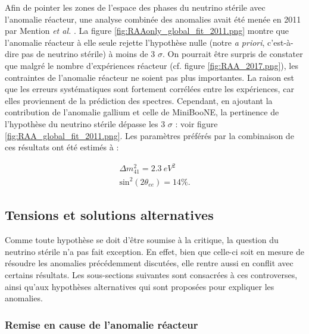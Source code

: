 Afin de pointer les zones de l'espace des phases du neutrino stérile avec l'anomalie réacteur, une analyse combinée des anomalies avait été menée en 2011 par Mention \textit{et al.} \cite{Mention:2011rk}. La figure \ref{fig:RAAonly_global_fit_2011.png} montre que l'anomalie réacteur à elle seule rejette l'hypothèse nulle (notre \textit{a priori}, c'est-à-dire pas de neutrino stérile) à moins de 3 $\sigma$. On pourrait être surpris de constater que malgré le nombre d'expériences réacteur (cf. figure \ref{fig:RAA_2017.png}), les contraintes de l'anomalie réacteur ne soient pas plus importantes. La raison est que les erreurs systématiques sont fortement corrélées entre les expériences, car elles proviennent de la prédiction des spectres. Cependant, en ajoutant la contribution de l'anomalie gallium et celle de MiniBooNE, la pertinence de l'hypothèse du neutrino stérile dépasse les 3 $\sigma$ : voir figure \ref{fig:RAA_global_fit_2011.png}. Les paramètres préférés par la combinaison de ces résultats ont été estimés à \cite{Mention:2011rk} :

\begin{equation}
\begin{gathered}
    \Delta m^2_{41} = \SI{2.3}{eV^2}\\
    \textrm{sin}^2\left(2 \theta_{ee} \right) = 14 \%.
\end{gathered}
\end{equation}


\bigbreak

\subsection{Tensions et solutions alternatives}

Comme toute hypothèse se doit d'être soumise à la critique, la question du neutrino stérile n'a pas fait exception. En effet, bien que celle-ci soit en mesure de résoudre les anomalies précédemment discutées, elle rentre aussi en conflit avec certains résultats. Les sous-sections suivantes sont consacrées à ces controverses, ainsi qu'aux hypothèses alternatives qui sont proposées pour expliquer les anomalies.

\bigbreak

\subsubsection*{Remise en cause de l'anomalie réacteur}

